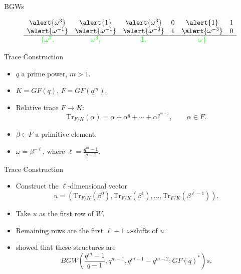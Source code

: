 \documentclass{beamer}
\newcommand{\tr}{\mathrm{Tr}_{F/K}}
\newcommand{\ggreen}[1]{\textcolor{green}{#1}}
\begin{document}
 
 \begin{frame}{BGWs}
  
  \[
   \begin{array}{cccccc}
  \alert{\omega^3}&\alert{1}&\alert{\omega^3}&0&\alert{1}&1\\
  \alert{\omega^{-1}}&\alert{\omega^{-1}}&\alert{\omega^{-3}}&1&\alert{\omega^{-3}}&0 \\ \hline
  \ggreen{\{\omega^2,}&\ggreen{\omega^3,}&\ggreen{1,}&&\ggreen{\omega\}}&
   \end{array}
  \]

 \end{frame}
 
 
 \begin{frame}{Trace Construction}
  
  \begin{itemize}
   \item $q$ a prime power, $m>1$.
   \item $K=GF(q)$, $F=GF(q^m)$.
   \item Relative trace $F \rightarrow K$:
   $$
   \tr(\alpha) = \alpha + \alpha^q + \cdots + \alpha^{q^{m-1}}, \qquad \alpha \in F.
   $$
   \item $\beta \in F$ a primitive element.
   \item $\omega = \beta^{-\ell}$, where $\ell=\frac{q^m-1}{q-1}$.
  \end{itemize}
  
 \end{frame}
 
 
 \begin{frame}{Trace Construction}
  
  \begin{itemize}
   \item Construct the $\ell$-dimensional vector
   $$
   u = (\tr(\beta^0), \tr(\beta^1), \dots, \tr(\beta^{\ell-1})).
   $$
   \item Take $u$ as the first row of $W$.
   \item Remaining rows are the first $\ell-1$ $\omega$-shifts of $u$.
   \item \cite{jungnickel-tonchev-perfect-codes-2} showed that these structures are 
   $$
   BGW\left( \frac{q^m-1}{q-1},q^{m-1},q^{m-1}-q^{m-2};GF(q)^* \right)s.
   $$
  \end{itemize}
  
 \end{frame}
 
\end{document}
